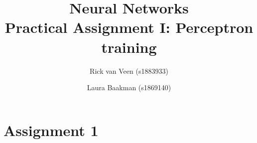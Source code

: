 \documentclass{article}
\title{Neural Networks\\Practical Assignment I: Perceptron training}
\author{Rick van Veen (s1883933) \and Laura Baakman (s1869140)}
\begin{document}
\maketitle

\section*{Assignment 1}

	
\clearpage
\appendix

\end{document}
